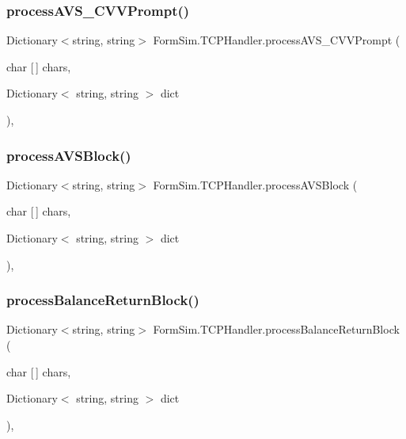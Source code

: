 \subsubsection{\texorpdfstring{process\+A\+V\+S\+\_\+\+C\+V\+V\+Prompt()}{processAVS\_CVVPrompt()}}
{\footnotesize\ttfamily Dictionary$<$string, string$>$ Form\+Sim.\+T\+C\+P\+Handler.\+process\+A\+V\+S\+\_\+\+C\+V\+V\+Prompt (\begin{DoxyParamCaption}\item[{char \mbox{[}$\,$\mbox{]}}]{chars,  }\item[{Dictionary$<$ string, string $>$}]{dict }\end{DoxyParamCaption})\hspace{0.3cm}{\ttfamily [inline]}, {\ttfamily [private]}}

\mbox{\label{class_form_sim_1_1_t_c_p_handler_ac58ef5265837b773924480e78f287737}} 
\subsubsection{\texorpdfstring{process\+A\+V\+S\+Block()}{processAVSBlock()}}
{\footnotesize\ttfamily Dictionary$<$string, string$>$ Form\+Sim.\+T\+C\+P\+Handler.\+process\+A\+V\+S\+Block (\begin{DoxyParamCaption}\item[{char \mbox{[}$\,$\mbox{]}}]{chars,  }\item[{Dictionary$<$ string, string $>$}]{dict }\end{DoxyParamCaption})\hspace{0.3cm}{\ttfamily [inline]}, {\ttfamily [private]}}

\mbox{\label{class_form_sim_1_1_t_c_p_handler_a8edc653678104381cd77c4ec14808610}} 
\subsubsection{\texorpdfstring{process\+Balance\+Return\+Block()}{processBalanceReturnBlock()}}
{\footnotesize\ttfamily Dictionary$<$string, string$>$ Form\+Sim.\+T\+C\+P\+Handler.\+process\+Balance\+Return\+Block (\begin{DoxyParamCaption}\item[{char \mbox{[}$\,$\mbox{]}}]{chars,  }\item[{Dictionary$<$ string, string $>$}]{dict }\end{DoxyParamCaption})\hspace{0.3cm}{\ttfamily [inline]}, {\ttfamily [private]}}

